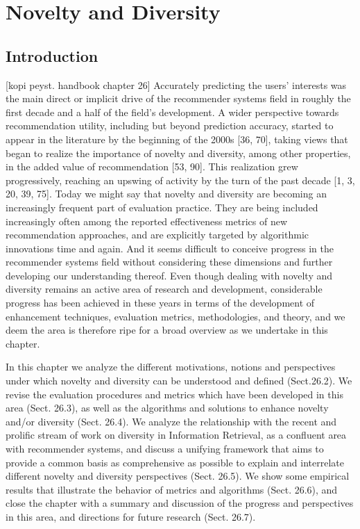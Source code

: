 
\chapter{Novelty and Diversity}\label{chapter:novelty_and_diversity}

\section{Introduction}
[kopi peyst. handbook chapter 26]
Accurately predicting the users’ interests was the main direct or implicit drive of the recommender systems field in roughly the first decade and a half of the field’s development. A wider perspective towards recommendation utility, including but beyond prediction accuracy, started to appear in the literature by the beginning of the 2000s [36, 70], taking views that began to realize the importance of novelty and diversity, among other properties, in the added value of recommendation [53, 90]. This realization grew progressively, reaching an upswing of activity by the turn of the past decade [1, 3, 20, 39, 75]. Today we might say that novelty and diversity are becoming an increasingly frequent part of evaluation practice. They are being included increasingly often among the reported effectiveness metrics of new recommendation approaches, and are explicitly targeted by algorithmic innovations time and again. And it seems difficult to conceive progress in the recommender systems field without considering these dimensions and further developing our understanding thereof. Even though dealing with novelty and diversity remains an active area of research and development, considerable progress has been achieved in these years in terms of the development of enhancement techniques, evaluation metrics, methodologies, and theory, and we deem the area is therefore ripe for a broad overview as we undertake in this chapter.

In this chapter we analyze the different motivations, notions and perspectives under which novelty and diversity can be understood and defined (Sect.26.2). We revise the evaluation procedures and metrics which have been developed in this area (Sect. 26.3), as well as the algorithms and solutions to enhance novelty and/or diversity (Sect. 26.4). We analyze the relationship with the recent and prolific stream of work on diversity in Information Retrieval, as a confluent area with recommender systems, and discuss a unifying framework that aims to provide a common basis as comprehensive as possible to explain and interrelate different novelty and diversity perspectives (Sect. 26.5). We show some empirical results that illustrate the behavior of metrics and algorithms (Sect. 26.6), and close the chapter with a summary and discussion of the progress and perspectives in this area, and directions for future research (Sect. 26.7).


